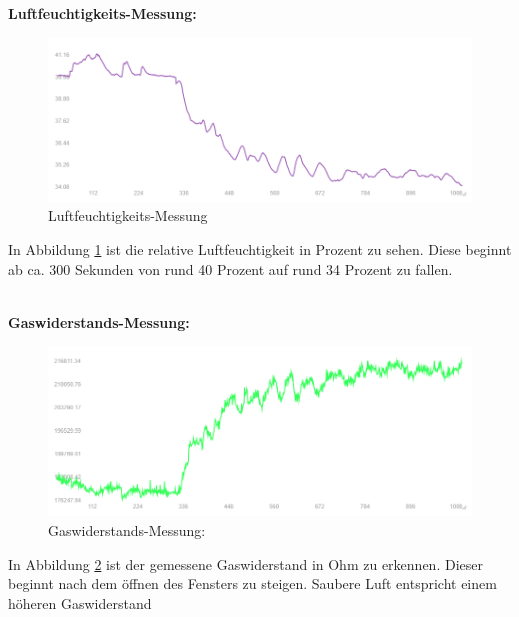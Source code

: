 \begin{inhalt}
\newpage

\textbf{Luftfeuchtigkeits-Messung:}

\begin{figure}[!htb]
\centering
\includegraphics[width=1\textwidth]{files/Tobias/pics/Messungen/luftfeuchtigkeit.PNG}
\caption[Luftfeuchtigkeits-Messung]{Luftfeuchtigkeits-Messung}
\label{fig:Luftfeuchtigkeit-Messung}
\end{figure}

In Abbildung \ref{fig:Luftfeuchtigkeit-Messung} ist die relative Luftfeuchtigkeit in Prozent zu sehen. Diese beginnt ab ca. 300 Sekunden von rund 40 Prozent auf rund 34 Prozent zu fallen. 

\bigskip \\

\textbf{Gaswiderstands-Messung:}

\begin{figure}[!htb]
\centering
\includegraphics[width=1\textwidth]{files/Tobias/pics/Messungen/gas.PNG}
\caption[Gaswiderstands-Messung:]{Gaswiderstands-Messung:}
\label{fig:Gaswiderstand-Messung}
\end{figure}

In Abbildung \ref{fig:Gaswiderstand-Messung} ist der gemessene Gaswiderstand in Ohm zu erkennen. Dieser beginnt nach dem öffnen des Fensters zu steigen. Saubere Luft entspricht einem höheren Gaswiderstand \cite{BME}

\end{inhalt}